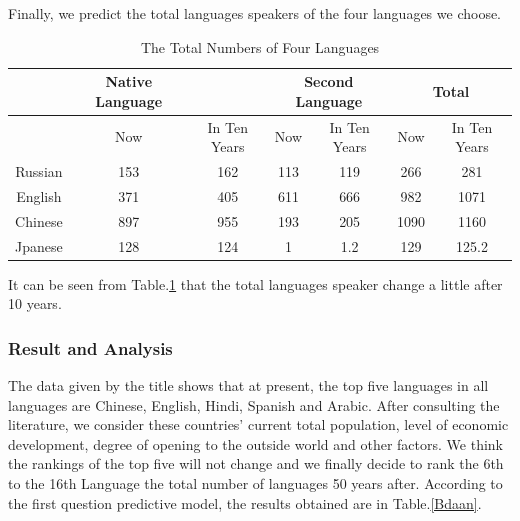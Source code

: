 Finally, we predict the total languages speakers of the four languages we choose.

\begin{table}[H]
\centering
\caption{The Total Numbers of Four Languages}
\label{Bjieguo}
\begin{tabular}{cccclcl}
            \toprule
                     & Native Language      &                      & \multicolumn{2}{c}{Second Language}                     & \multicolumn{2}{c}{Total}                               \\
                     \midrule
                     & Now                  & In Ten Years         & Now                  & \multicolumn{1}{c}{In Ten Years} & Now                  & \multicolumn{1}{c}{In Ten Years} \\
Russian              & 153                  & 162                  & 113                  & \multicolumn{1}{c}{119}          & 266                  & \multicolumn{1}{c}{281}          \\
English              & 371                  & 405                  & 611                  & \multicolumn{1}{c}{666}          & 982                  & \multicolumn{1}{c}{1071}         \\
Chinese              & 897                  & 955                  & 193                  & \multicolumn{1}{c}{205}          & 1090                 & \multicolumn{1}{c}{1160}         \\
Jpanese              & 128                  & 124                  & 1                    & \multicolumn{1}{c}{1.2}          & 129                  & \multicolumn{1}{c}{125.2} \\
\bottomrule
\end{tabular}
\end{table}

It can be seen from Table.\ref{Bjieguo} that the total languages speaker change a little after 10 years.

\subsubsection{Result and Analysis}
The data given by the title shows that at present, the top five languages in all languages are Chinese, English, Hindi, Spanish and Arabic. After consulting the literature, we consider these countries' current total population, level of economic development, degree of opening to the outside world and other factors. We think the rankings of the top five will not change and we finally decide to rank the 6th to the 16th Language the total number of languages 50 years after. According to the first question predictive model, the results obtained are in Table.\ref{Bdaan}.

